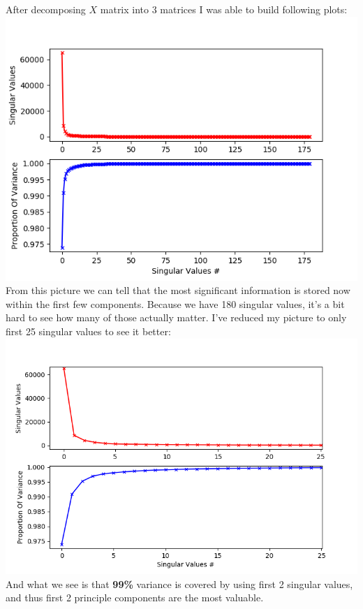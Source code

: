 \documentclass[12pt, letterpaper]{article}
\begin{document}
\begin{enumerate}[label=\Roman*.]
	After decomposing  \(X\) matrix into 3 matrices I was able to build following plots:\\
	\includegraphics[scale=0.95]{scree.png} \\

	From this picture we can tell that the most significant information is stored now within the first few components. Because we have 180 singular values, it's a bit hard to see how many of those actually matter. I've reduced my picture to only first 25 singular values to see it better:\\
	\includegraphics[scale=0.8]{kpcs.png} \\
	
	And what we see is that {\bf 99\%} variance is covered by using first 2 singular values, and thus first 2 principle components are the most valuable. \\
	

\end{enumerate}
\end{document}

